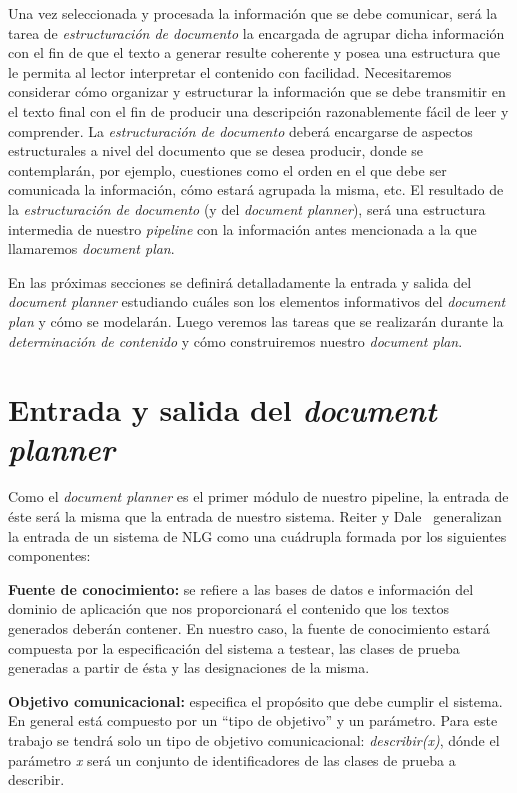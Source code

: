 Una vez seleccionada y procesada la información que se debe comunicar, será la tarea de \emph{estructuración de documento} la encargada de agrupar dicha información con el fin de que el texto a generar resulte coherente y posea una estructura que le permita al lector interpretar el contenido con facilidad. Necesitaremos considerar cómo organizar y estructurar la información que se debe transmitir en el texto final con el fin de producir una descripción razonablemente fácil de leer y comprender. La \emph{estructuración de documento} deberá encargarse de aspectos estructurales a nivel del documento que se desea producir, donde se contemplarán, por ejemplo, cuestiones como el orden en el que debe ser comunicada la información, cómo estará agrupada la misma, etc. El resultado de la \emph{estructuración de documento} (y del \textit{document planner}), será una estructura intermedia de nuestro \textit{pipeline} con la información antes mencionada a la que llamaremos \emph{document plan}. 

En las próximas secciones se definirá detalladamente la entrada y salida del \textit{document planner} estudiando cuáles son los elementos informativos del \emph{document plan} y cómo se modelarán. Luego veremos las tareas que se realizarán durante la \emph{determinación de contenido} y cómo construiremos nuestro \textit{document plan}. 

\section{Entrada y salida del \textit{document planner}}
Como el \textit{document planner} es el primer módulo de nuestro pipeline, la entrada de éste será la misma que la entrada de nuestro sistema. Reiter y Dale~\cite{reiter_dale} generalizan la entrada de un sistema de NLG como una cuádrupla formada por los siguientes componentes:

\bigskip
\noindent
\textbf{Fuente de conocimiento:} se refiere a las bases de datos e información del dominio de aplicación que nos proporcionará el contenido que los textos generados deberán contener.
En nuestro caso, la fuente de conocimiento estará compuesta por la especificación del sistema a testear, las clases de prueba generadas a partir de ésta y las designaciones de la misma. 

\bigskip
\noindent
\textbf{Objetivo comunicacional:} especifica el propósito que debe cumplir el sistema. En general está compuesto por un ``tipo de objetivo'' y un parámetro.
Para este trabajo se tendrá solo un tipo de objetivo comunicacional: \emph{describir(x)}, dónde el parámetro \emph{x} será un conjunto de identificadores de las clases de prueba a describir.

